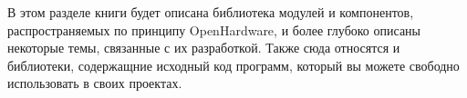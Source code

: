 \secdown

В этом разделе книги будет описана библиотека модулей и компонентов,
распространяемых по принципу OpenHardware, и более глубоко описаны некоторые
темы, связанные с их разработкой. Также сюда относятся и библиотеки, содержащние
исходный код программ, который вы можете свободно использовать в своих проектах.

\clearpage



\secup
